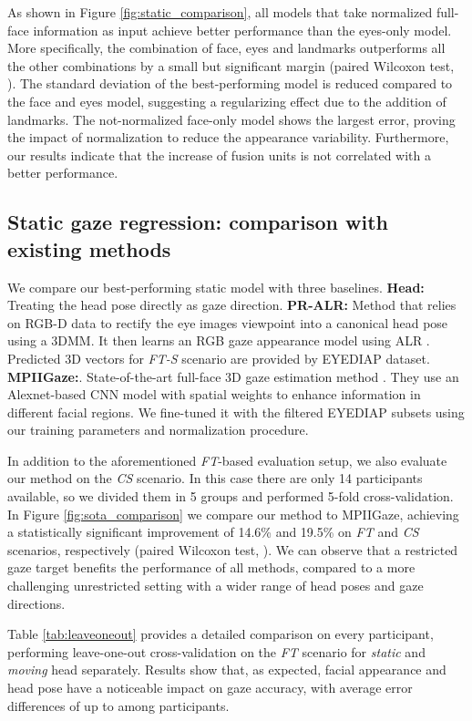\documentclass{bmvc2k}
\begin{document}
As shown in Figure \ref{fig:static_comparison}, all models that take normalized full-face information as input achieve better performance than the eyes-only model. More specifically, the combination of face, eyes and landmarks outperforms all the other combinations by a small but significant margin (paired Wilcoxon test, ). The standard deviation of the best-performing model is reduced compared to the face and eyes model, suggesting a regularizing effect due to the addition of landmarks. The not-normalized face-only model shows the largest error, proving the impact of normalization to reduce the appearance variability. Furthermore, our results indicate that the increase of fusion units is not correlated with a better performance. 


\subsection{Static gaze regression: comparison with existing methods}
\label{sec:comparison_sota}


We compare our best-performing static model with three baselines. \textbf{Head:} Treating the head pose directly as gaze direction. \textbf{PR-ALR:} Method that relies on RGB-D data to rectify the eye images viewpoint into a canonical head pose using a 3DMM. It then learns an RGB gaze appearance model using ALR \cite{mora2012gaze}. Predicted 3D vectors for \textit{FT-S} scenario are provided by EYEDIAP dataset. \textbf{MPIIGaze:}. State-of-the-art full-face 3D gaze estimation method \cite{zhang2015appearance}. They use an Alexnet-based CNN model with spatial weights to enhance information in different facial regions. We fine-tuned it with the filtered EYEDIAP subsets using our training parameters and normalization procedure. 

In addition to the aforementioned \textit{FT}-based evaluation setup, we also evaluate our method on the \textit{CS} scenario. In this case there are only 14 participants available, so we divided them in 5 groups and performed 5-fold cross-validation. In Figure \ref{fig:sota_comparison} we compare our method to MPIIGaze, achieving a statistically significant improvement of 14.6\% and 19.5\% on \textit{FT} and \textit{CS} scenarios, respectively (paired Wilcoxon test, ). We can observe that a restricted gaze target benefits the performance of all methods, compared to a more challenging unrestricted setting with a wider range of head poses and gaze directions.

Table \ref{tab:leaveoneout} provides a detailed comparison on every participant, performing leave-one-out cross-validation on the \textit{FT} scenario for \textit{static} and \textit{moving} head separately. Results show that, as expected, facial appearance and head pose have a noticeable impact on gaze accuracy, with average error differences of up to  among participants.  
\end{document}
